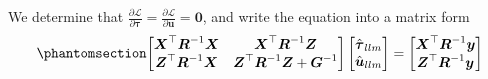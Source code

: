 \documentclass[
  a4paper,
  oneside,
  openany,
  12pt,
  onecolumn]{book}
\theoremstyle{definition}
\theoremstyle{plain}
\theoremstyle{remark}
\begin{document}
We determine that
\(\frac{\partial\mathcal{L}}{\partial\boldsymbol{\tau}}=\frac{\partial\mathcal{L}}{\partial\boldsymbol{u}}=\boldsymbol{0}\),
and write the equation into a matrix form
\begin{equation}\phantomsection\label{eq-ll}{
\begin{bmatrix}
\boldsymbol{X}^\top\boldsymbol{R}^{-1}\boldsymbol{X} & \boldsymbol{X}^\top\boldsymbol{R}^{-1}\boldsymbol{Z}\\
\boldsymbol{Z}^\top\boldsymbol{R}^{-1}\boldsymbol{X} & \boldsymbol{Z}^\top\boldsymbol{R}^{-1}\boldsymbol{Z}+ \boldsymbol{G}^{-1}
\end{bmatrix}
\begin{bmatrix}
\hat{\boldsymbol{\tau}}_{llm}\\
\hat{\boldsymbol{u}}_{llm}
\end{bmatrix}=
\begin{bmatrix}
\boldsymbol{X}^\top\boldsymbol{R}^{-1}\boldsymbol{y}\\
\boldsymbol{Z}^\top\boldsymbol{R}^{-1}\boldsymbol{y}
\end{bmatrix}
}\end{equation}
\end{document}
